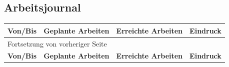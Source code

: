 \begin{landscape}
\subsection{Arbeitsjournal}
\label{sec:orgbda3d36}

\begin{longtable}{|p{2cm}|p{5cm}|p{5cm}|p{7cm}|}
\hline
\textbf{Von/Bis}\cellcolor[HTML]{C0C0C0} & \textbf{Geplante Arbeiten}\cellcolor[HTML]{C0C0C0} & \textbf{Erreichte Arbeiten}\cellcolor[HTML]{C0C0C0} & \textbf{Eindruck}\cellcolor[HTML]{C0C0C0}\\
\hline
\endfirsthead
\multicolumn{4}{l}{Fortsetzung von vorheriger Seite} \\
\hline

\textbf{Von/Bis}\cellcolor[HTML]{C0C0C0} & \textbf{Geplante Arbeiten}\cellcolor[HTML]{C0C0C0} & \textbf{Erreichte Arbeiten}\cellcolor[HTML]{C0C0C0} & \textbf{Eindruck}\cellcolor[HTML]{C0C0C0} \\


\end{longtable}
\end{landscape}
